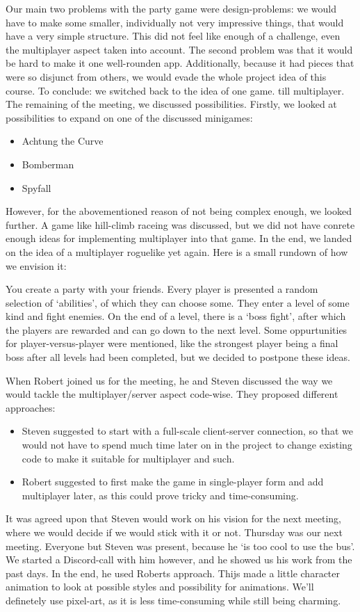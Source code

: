 \documentclass[../main.tex]{subfiles}
\begin{document}
Our main two problems with the party game were design-problems: we would have to make some smaller, individually not very impressive things, that would have a very simple structure. This did not feel like enough of a challenge, even the multiplayer aspect taken into account. The second problem was that it would be hard to make it one well-rounden app. Additionally, because it had pieces that were so disjunct from others, we would evade the whole project idea of this course. To conclude: we switched back to the idea of one game. till multiplayer. The remaining of the meeting, we discussed possibilities. Firstly, we looked at possibilities to expand on one of the discussed minigames:
\begin{itemize}
	\item Achtung the Curve
	\item Bomberman
	\item Spyfall
\end{itemize}
However, for the abovementioned reason of not being complex enough, we looked further. A game like hill-climb raceing was discussed, but we did not have conrete enough ideas for implementing multiplayer into that game. In the end, we landed on the idea of a multiplayer roguelike yet again. Here is a small rundown of how we envision it:

You create a party with your friends. Every player is presented a random selection of `abilities', of which they can choose some. They enter a level of some kind and fight enemies. On the end of a level, there is a `boss fight', after which the players are rewarded and can go down to the next level. Some oppurtunities for player-versus-player were mentioned, like the strongest player being a final boss after all levels had been completed, but we decided to postpone these ideas.

When Robert joined us for the meeting, he and Steven discussed the way we would tackle the multiplayer/server aspect code-wise. They proposed different approaches:
\begin{itemize}
	\item Steven suggested to start with a full-scale client-server connection, so that we would not have to spend much time later on in the project to change existing code to make it suitable for multiplayer and such.
	\item Robert suggested to first make the game in single-player form and add multiplayer later, as this could prove tricky and time-consuming.
\end{itemize} 
It was agreed upon that Steven would work on his vision for the next meeting, where we would decide if we would stick with it or not.
\bigbreak\noindent
Thursday was our next meeting. Everyone but Steven was present, because he `is too cool to use the bus'. We started a Discord-call with him however, and he showed us his work from the past days. In the end, he used Roberts approach. Thijs made a little character animation to look at possible styles and possibility for animations. We'll definetely use pixel-art, as it is less time-consuming while still being charming.
\end{document}
